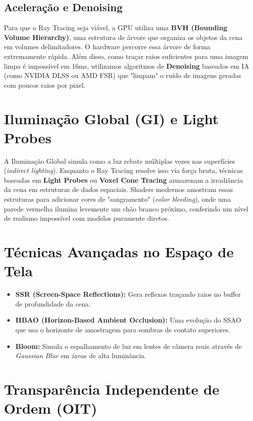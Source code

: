 \subsection{Aceleração e Denoising}

Para que o Ray Tracing seja viável, a GPU utiliza uma \textbf{BVH (Bounding Volume Hierarchy)}, uma estrutura de árvore que organiza os objetos da cena em volumes delimitadores. O hardware percorre essa árvore de forma extremamente rápida. Além disso, como traçar raios suficientes para uma imagem limpa é impossível em 16ms, utilizamos algoritmos de \textbf{Denoising} baseados em IA (como NVIDIA DLSS ou AMD FSR) que "limpam" o ruído de imagens geradas com poucos raios por pixel.

\section{Iluminação Global (GI) e Light Probes}

A Iluminação Global simula como a luz rebate múltiplas vezes nas superfícies (\textit{indirect lighting}). Enquanto o Ray Tracing resolve isso via força bruta, técnicas baseadas em \textbf{Light Probes} ou \textbf{Voxel Cone Tracing} armazenam a irradiância da cena em estruturas de dados espaciais. Shaders modernos amostram essas estruturas para adicionar cores de "sangramento" (\textit{color bleeding}), onde uma parede vermelha ilumina levemente um chão branco próximo, conferindo um nível de realismo impossível com modelos puramente diretos.

\section{Técnicas Avançadas no Espaço de Tela}

\begin{itemize}
    \item \textbf{SSR (Screen-Space Reflections):} Gera reflexos traçando raios no buffer de profundidade da cena.
    \item \textbf{HBAO (Horizon-Based Ambient Occlusion):} Uma evolução do SSAO que usa o horizonte de amostragem para sombras de contato superiores.
    \item \textbf{Bloom:} Simula o espalhamento de luz em lentes de câmera reais através de \textit{Gaussian Blur} em áreas de alta luminância.
\end{itemize}

\section{Transparência Independente de Ordem (OIT)}

